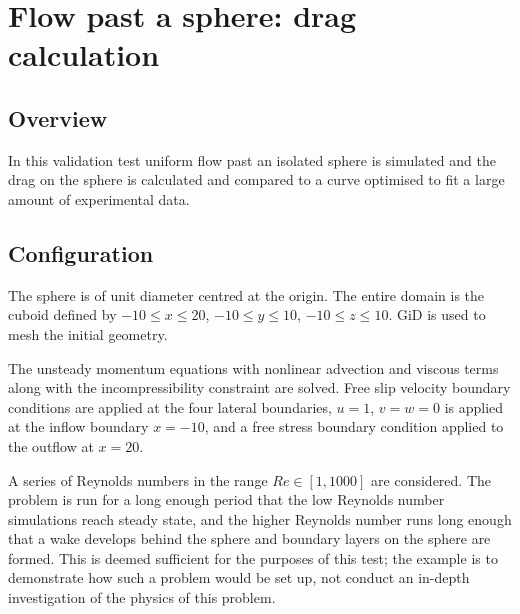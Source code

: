 
\section{Flow past a sphere: drag calculation}
\label{sec:flow_past_sphere}
\subsection{Overview}
In this validation test uniform flow past an isolated sphere is simulated
and the drag on the sphere is calculated and compared to a curve optimised
to fit a large amount of experimental data.

\subsection{Configuration}
The sphere is of unit diameter centred at the origin. The entire domain is
the cuboid defined by $-10\le x\le 20$, $-10\le y\le 10$, $-10\le z\le 10$.
GiD is used to mesh the initial geometry.

The unsteady momentum equations with nonlinear advection and viscous terms
along with the incompressibility constraint are solved. Free slip velocity
boundary conditions are applied at the four lateral boundaries, $u=1$, $v=w=0$ is
applied at the inflow boundary $x=-10$, and a free stress boundary condition
applied to the outflow at $x=20$. 

A series of Reynolds numbers in the range
$Re\in [1,1000]$ are considered. The problem is run for a long enough
period that the low Reynolds number simulations reach steady state, and the
higher Reynolds number runs long enough that a wake develops behind the
sphere and boundary layers on the sphere are formed.  This is deemed
sufficient for the purposes of this test; the example is to demonstrate
how such a problem would be set up, not conduct an in-depth 
investigation of the physics of this problem.

